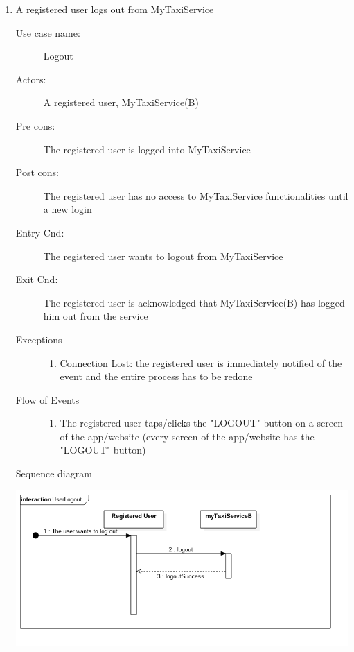 \documentclass[11pt,titlepage]{article} %
\begin{document}
\begin{enumerate}
	       \item A registered user logs out from MyTaxiService
		\begin{description}
		        \item [Use case name:] Logout
		        \item [Actors:] A registered user, MyTaxiService(B)
		        \item [Pre cons:] The registered user is logged into MyTaxiService
		        \item [Post cons:] The registered user has no access to MyTaxiService functionalities
		        until a new login
		        \item [Entry Cnd:] The registered user wants to logout from MyTaxiService
		        \item [Exit Cnd:] The registered user is acknowledged that MyTaxiService(B) has logged him out from
		        the service
		        \item [Exceptions]\hfill
			\begin{enumerate}
			          \item Connection Lost: the registered user is immediately notified of the event and the entire process
			          has to be redone
			\end{enumerate}
		        \item [Flow of Events]\hfill
			\begin{enumerate}
			          \item The registered user taps/clicks the "LOGOUT" button on a screen of the app/website
			          (every screen of the app/website has the "LOGOUT" button)
			\end{enumerate}
		\end{description}
		\newpage
		Sequence diagram
		\begin{center}
		\includegraphics[scale=0.52]{usecase7.png}
		\end{center}


\end{enumerate}
\end{document}
